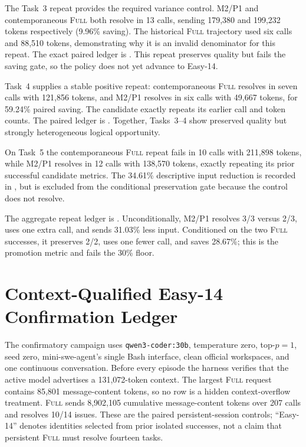 \documentclass[11pt]{article}
\begin{document}
The Task~3 repeat provides the required variance control.  M2/P1 and
contemporaneous \textsc{Full} both resolve in 13 calls, sending 179,380 and
199,232 tokens respectively (9.96\% saving).  The historical \textsc{Full}
trajectory used six calls and 88,510 tokens, demonstrating why it is an invalid
denominator for this repeat.  The exact paired ledger is
.  This repeat preserves quality
but fails the saving gate, so the policy does not yet advance to Easy-14.

Task~4 supplies a stable positive repeat: contemporaneous \textsc{Full}
resolves in seven calls with 121,856 tokens, and M2/P1 resolves in six calls
with 49,667 tokens, for 59.24\% paired saving.  The candidate exactly repeats
its earlier call and token counts.  The paired ledger is
.  Together, Tasks~3--4 show
preserved quality but strongly heterogeneous logical opportunity.

On Task~5 the contemporaneous \textsc{Full} repeat fails in 10 calls with
211,898 tokens, while M2/P1 resolves in 12 calls with 138,570 tokens, exactly
repeating its prior successful candidate metrics.  The 34.61\% descriptive
input reduction is recorded in
, but is excluded from the
conditional preservation gate because the control does not resolve.

The aggregate repeat ledger is
.  Unconditionally, M2/P1
resolves 3/3 versus 2/3, uses one extra call, and sends 31.03\% less input.
Conditioned on the two \textsc{Full} successes, it preserves 2/2, uses one
fewer call, and saves 28.67\%; this is the promotion metric and fails the 30\%
floor.

\section{Context-Qualified Easy-14 Confirmation Ledger}

The confirmatory campaign uses \texttt{qwen3-coder:30b}, temperature zero,
top-$p=1$, seed zero, mini-swe-agent's single Bash interface, clean official
workspaces, and one continuous conversation.  Before every episode the harness
verifies that the active model advertises a 131,072-token context.  The largest
\textsc{Full} request contains 85,801 message-content tokens, so no row is a
hidden context-overflow treatment.  \textsc{Full} sends 8,902,105 cumulative
message-content tokens over 207 calls and resolves 10/14 issues.  These are the
paired persistent-session controls; ``Easy-14'' denotes identities selected
from prior isolated successes, not a claim that persistent \textsc{Full} must
resolve fourteen tasks.
\end{document}
